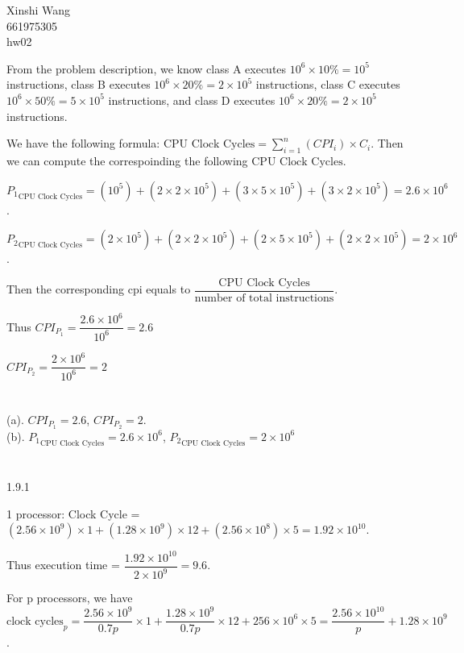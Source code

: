 \documentclass[12pt]{article}
\begin{document}
	\noindent Xinshi Wang\\
	661975305\\
	hw02\\
	
	
	From the problem description, we know class A executes $10^6 \times 10\% = 10^5$ instructions, class B executes $10^6 \times 20\% = 2 \times 10^5$ instructions, class C executes $10^6 \times 50\% = 5 \times 10^5$ instructions, and class D executes $10^6 \times 20\% = 2 \times 10^5$ instructions.
	
	We have the following formula: $\text{CPU Clock Cycles} = \sum_{i=1}^n (CPI_i) \times C_i$. Then we can compute the correspoinding the following $\text{CPU Clock Cycles}$.
	
	${P_1}_{\text{CPU Clock Cycles}} = (10^5)+(2 \times 2 \times 10^5)+(3 \times 5 \times 10^5) + (3 \times 2 \times 10^5) = 2.6 \times 10^6$.
	
	${P_2}_{\text{CPU Clock Cycles}} = (2 \times 10^5)+(2 \times 2 \times 10^5)+(2 \times 5 \times 10^5) + (2 \times 2 \times 10^5) = 2 \times 10^6$.
	
	Then the corresponding cpi equals to $\dfrac{\text{CPU Clock Cycles}}{\text{number of total instructions}}$.
	
	Thus $CPI_{P_1} = \dfrac{2.6 \times 10^6}{10^6} = 2.6$
	
	$CPI_{P_2} = \dfrac{2 \times 10^6}{10^6} = 2$\\\\\\
	(a). $CPI_{P_1} = 2.6$, $CPI_{P_2} = 2$.\\
	(b). 	${P_1}_{\text{CPU Clock Cycles}} = 2.6 \times 10^6$, ${P_2}_{\text{CPU Clock Cycles}} = 2 \times 10^6$\\
	
	\\\\
	1.9.1
	
	1 processor: Clock Cycle = $(2.56 \times 10^9) \times 1 + (1.28 \times 10^9) \times 12 + (2.56 \times 10^8) \times 5 = 1.92 \times 10^{10}$.
	
	Thus execution time = $\dfrac{1.92 \times 10^{10}}{2 \times 10^9} = 9.6$.
	
	For p processors, we have $\text{clock cycles}_p = \dfrac{2.56 \times 10^9}{0.7p} \times 1 + \dfrac{1.28 \times 10^9}{0.7p} \times 12 + 256 \times 10^6 \times 5 = \dfrac{2.56 \times 10^{10}}{p} + 1.28 \times 10^9$.  
	
\end{document}
